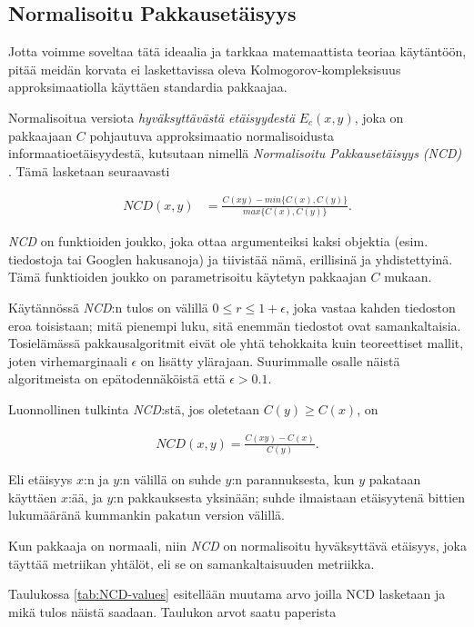 \documentclass[12pt,finnish]{tktltiki2}
\theoremstyle{definition}
\theoremstyle{remark}
\begin{document}
\subsection{Normalisoitu Pakkausetäisyys} %
\label{sub:normalisoitu_pakkausetaisyys}

  Jotta voimme soveltaa tätä ideaalia ja tarkkaa matemaattista teoriaa käytäntöön, pitää meidän korvata ei laskettavissa oleva Kolmogorov-kompleksisuus approksimaatiolla käyttäen standardia pakkaajaa.

  Normalisoitua versiota \emph{hyväksyttävästä etäisyydestä} $E_c(x,y)$, joka on pakkaajaan $C$ pohjautuva approksimaatio normalisoidusta informaatioetäisyydestä, kutsutaan nimellä \emph{Normalisoitu Pakkausetäisyys (NCD)} \cite{CV05}.
  Tämä lasketaan seuraavasti

  \begin{align}
    NCD(x,y) &= \frac{C(xy)-min\{C(x),C(y)\}}{max\{C(x),C(y)\}}.
  \end{align}

  \emph{NCD} on funktioiden joukko, joka ottaa argumenteiksi kaksi objektia (esim. tiedostoja tai Googlen hakusanoja) ja tiivistää nämä, erillisinä ja yhdistettyinä.
  Tämä funktioiden joukko on parametrisoitu käytetyn pakkaajan $C$ mukaan.

  Käytännössä \emph{NCD}:n tulos on välillä $0 \leq r \leq 1+ \epsilon$, joka vastaa kahden tiedoston eroa toisistaan; mitä pienempi luku, sitä enemmän tiedostot ovat samankaltaisia.
  Tosielämässä pakkausalgoritmit eivät ole yhtä tehokkaita kuin teoreettiset mallit, joten virhemarginaali $\epsilon$ on lisätty ylärajaan.
  Suurimmalle osalle näistä algoritmeista on epätodennäköistä että  $\epsilon > 0.1$.

  Luonnollinen tulkinta \emph{NCD}:stä, jos oletetaan $C(y) \geq C(x)$, on

  \begin{align}
    NCD(x,y) = \frac{C(xy)-C(x)}{C(y)}.
 \end{align}

  Eli etäisyys $x$:n ja $y$:n välillä on suhde $y$:n parannuksesta, kun $y$ pakataan käyttäen $x$:ää, ja $y$:n pakkauksesta yksinään; suhde ilmaistaan etäisyytenä bittien lukumääränä kummankin pakatun version välillä.

  Kun pakkaaja on normaali, niin \emph{NCD} on normalisoitu hyväksyttävä etäisyys, joka täyttää metriikan yhtälöt, eli se on samankaltaisuuden metriikka.

  Taulukossa \ref{tab:NCD-values} esitellään muutama arvo joilla NCD lasketaan ja mikä tulos näistä saadaan. Taulukon arvot saatu paperista \cite{cebrian2005common}
\end{document}
